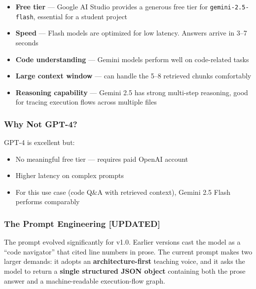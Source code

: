 \documentclass[a4paper,11pt]{article}
\begin{document}
\begin{itemize}
    \item \textbf{Free tier} --- Google AI Studio provides a generous free tier for \texttt{gemini-2.5-flash}, essential for a student project
    \item \textbf{Speed} --- Flash models are optimized for low latency. Answers arrive in 3--7 seconds
    \item \textbf{Code understanding} --- Gemini models perform well on code-related tasks
    \item \textbf{Large context window} --- can handle the 5--8 retrieved chunks comfortably
    \item \textbf{Reasoning capability} --- Gemini 2.5 has strong multi-step reasoning, good for tracing execution flows across multiple files
\end{itemize}

\subsubsection{Why Not GPT-4?}
GPT-4 is excellent but:
\begin{itemize}
    \item No meaningful free tier --- requires paid OpenAI account
    \item Higher latency on complex prompts
    \item For this use case (code Q\&A with retrieved context), Gemini 2.5 Flash performs comparably
\end{itemize}

\subsubsection{The Prompt Engineering \textbf{[UPDATED]}}
The prompt evolved significantly for v1.0. Earlier versions cast the model as a ``code navigator'' that cited line numbers in prose. The current prompt makes two larger demands: it adopts an \textbf{architecture-first} teaching voice, and it asks the model to return a \textbf{single structured JSON object} containing both the prose answer and a machine-readable execution-flow graph.
\end{document}
